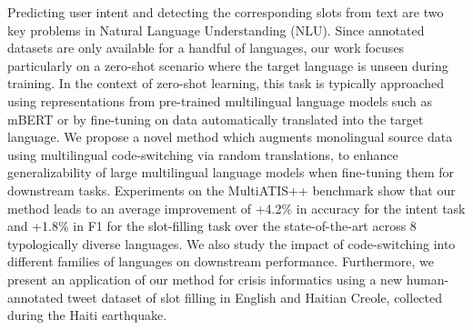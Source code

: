 Predicting user intent and detecting the corresponding slots from text are two key problems in Natural Language Understanding (NLU). Since annotated datasets are only available for a handful of languages, our work focuses particularly on a zero-shot scenario where the target language is unseen during training. In the context of zero-shot learning, this task is typically approached using representations from pre-trained multilingual language models such as mBERT or by fine-tuning on data automatically translated into the target language. We propose a novel method which augments monolingual source data using multilingual code-switching via random translations, to enhance generalizability of large multilingual language models when fine-tuning them for downstream tasks. Experiments on the MultiATIS++ benchmark show that our method leads to an average improvement of +4.2\% in accuracy for the intent task and +1.8\% in F1 for the slot-filling task over the state-of-the-art across 8 typologically diverse languages. We also study the impact of code-switching into different families of languages on downstream performance. Furthermore, we present an application of our method for crisis informatics using a new human-annotated tweet dataset of slot filling in English and Haitian Creole, collected during the Haiti earthquake.
